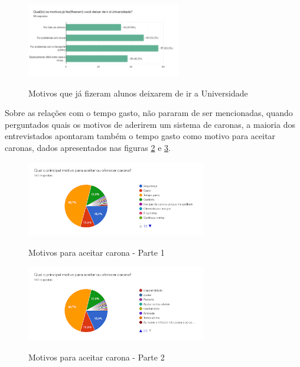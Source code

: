 \begin{figure}[!hbtp]
	\centering
	\caption{Motivos que já fizeram alunos deixarem de ir a Universidade}
	\includegraphics[width=0.6\textwidth]{./04-figuras/questionario/12.png}
	\label{fig:motivos-nao-ir-a-unifao}
\end{figure}

Sobre as relações com o tempo gasto, não pararam de ser mencionadas, quando perguntados quais os motivos de aderirem um sistema de caronas, a maioria dos entrevistados apontaram também o tempo gasto como motivo para aceitar caronas, dados apresentados nas figuras \ref{fig:motivosparacarona1} e \ref{fig:motivosparacarona2}.

\begin{figure}[!hbtp]
	\centering
	\caption{Motivos para aceitar carona - Parte 1}
	\includegraphics[width=0.7\textwidth]{./04-figuras/questionario/13.png}
	\label{fig:motivosparacarona1}
\end{figure}

\begin{figure}[!hbtp]
	\centering
	\caption{Motivos para aceitar carona - Parte 2}
	\includegraphics[width=0.7\textwidth]{./04-figuras/questionario/14.png}
	\label{fig:motivosparacarona2}
\end{figure}

